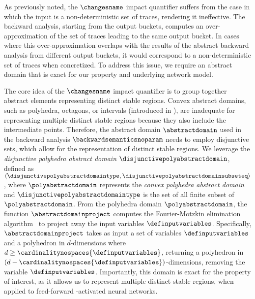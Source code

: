 As previously noted, the $\changesname$ impact quantifier suffers from the case in which the input is a non-deterministic set of traces, rendering it ineffective.
The backward analysis, starting from the output buckets, computes an over-approximation of the set of traces leading to the same output bucket.
In cases where this over-approximation overlaps with the results of the abstract backward analysis from different output buckets, it would correspond to a non-deterministic set of traces when concretized.
To address this issue, we require an abstract domain that is exact for our property and underlying network model.

The core idea of the $\changesname$ impact quantifier is to group together abstract elements representing distinct stable regions. Convex abstract domains, such as polyhedra, octagons, or intervals (introduced in ), are inadequate for representing multiple distinct stable regions because they also include the intermediate points. Therefore, the abstract domain $\abstractdomain$ used in the backward analysis $\backwardsemanticsnoparam$ needs to employ disjunctive sets, which allow for the representation of distinct stable regions.
%
We leverage the \textit{disjunctive polyhedra abstract domain} $\disjunctivepolyabstractdomain$, defined as
$
  \langle \disjunctivepolyabstractdomaintype, \disjunctivepolyabstractdomainsubseteq \rangle
$, where $\polyabstractdomain$ represents the \textit{convex polyhedra abstract domain}~ and $\disjunctivepolyabstractdomaintype$ is the set of all finite subset of $\polyabstractdomain$.
From the polyhedra domain $\polyabstractdomain$, the function $\abstractdomainproject$ computes the Fourier-Motzkin elimination algorithm~ to project away the input variables $\definputvariables$.
Specifically, $\abstractdomainproject$ takes as input a set of variables $\definputvariables$ and a polyhedron in $d$-dimensions where $d \ge \cardinalitynospaces{\definputvariables}$, returning a polyhedron in $(d-\cardinalitynospaces{\definputvariables})$-dimensions, removing the variable $\definputvariables$.
Importantly, this domain is exact for the property of interest, as it allows us to represent multiple distinct stable regions, when applied to feed-forward \relu-activated neural networks.

